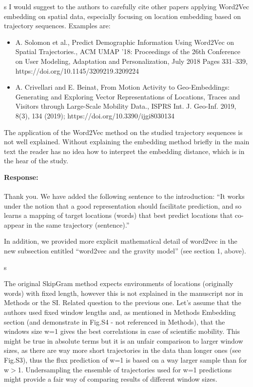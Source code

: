 \documentclass[12pt,a4paper]{article}
\newcommand{\response}[1]{{\noindent \textbf{Response:} \\ \\ \noindent #1}}
\newcommand{\rcomment}[1]{%
\vspace{10pt}
\begin{sectionbox}
s #1
\end{sectionbox}
}
\begin{document}
\rcomment{
	I would suggest to the authors to carefully cite other papers applying Word2Vec embedding on spatial data, especially focusing on location embedding based on trajectory sequences. Examples are:
	\begin{itemize}
		\item A. Solomon et al., Predict Demographic Information Using Word2Vec on Spatial Trajectories., ACM UMAP '18: Proceedings of the 26th Conference on User Modeling, Adaptation and Personalization, July 2018 Pages 331–339, https://doi.org/10.1145/3209219.3209224
		\item A. Crivellari and E. Beinat, From Motion Activity to Geo-Embeddings: Generating and Exploring Vector Representations of Locations, Traces and Visitors through Large-Scale Mobility Data., ISPRS Int. J. Geo-Inf. 2019, 8(3), 134 (2019); https://doi.org/10.3390/ijgi8030134

	\end{itemize}

	The application of the Word2Vec method on the studied trajectory sequences is not well explained. Without explaining the embedding method briefly in the main text the reader has no idea how to interpret the embedding distance, which is in the hear of the study.

}

\response{Thank you. 
We have added the following sentence to the introduction: “It works under the notion that a good representation should facilitate prediction, and so learns a mapping of target locations (words) that best predict locations that co-appear in the same trajectory (sentence).”

	In addition, we provided more explicit mathematical detail of word2vec in the new subsection entitled “word2vec and the gravity model” (see section 1, above).

}

\rcomment{

	The original SkipGram method expects environments of locations (originally words) with fixed length, however this is not explained in the manuscript nor in Methods or the SI.
	Related question to the previous one. Let’s assume that the authors used fixed window lengths and, as mentioned in Methods Embedding section (and demonstrate in Fig.S4 - not referenced in Methods), that the windows size w=1 gives the best correlations in case of scientific mobility. This might be true in absolute terms but it is an unfair comparison to larger window sizes, as there are way more short trajectories in the data than longer ones (see Fig.S3), thus the flux prediction of w=1 is based on a way larger sample than for w$>$1. Undersampling the ensemble of trajectories used for w=1 predictions might provide a fair way of comparing results of different window sizes.
}
\end{document}
